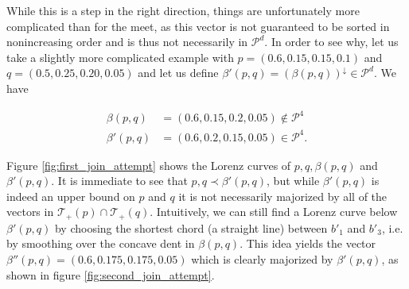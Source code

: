 While this is a step in the right direction, things are unfortunately more complicated than for the meet, as this vector is not guaranteed to be sorted in nonincreasing order and is thus not necessarily in $\mathcal{P}^d$. In order to see why, let us take a slightly more complicated example with $p = (0.6, 0.15, 0.15, 0.1)$ and $q = (0.5, 0.25, 0.20, 0.05)$ and let us define $\beta'(p, q) = (\beta(p, q))^\downarrow \in \mathcal{P}^d$. We have

\begin{align}
    \beta(p, q) &= (0.6, 0.15, 0.2, 0.05) \notin \mathcal{P}^4 \\
    \beta'(p, q) &= (0.6, 0.2, 0.15, 0.05) \in \mathcal{P}^4.
\end{align}

Figure \ref{fig:first_join_attempt} shows the Lorenz curves of $p, q, \beta(p, q)$ and $\beta'(p, q)$. It is immediate to see that $p, q \prec \beta'(p, q)$, but while $\beta'(p, q)$  is indeed an upper bound on $p$ and $q$ it is not necessarily majorized by all of the vectors in $\mathcal{T}_+(p) \cap \mathcal{T}_+(q)$. Intuitively, we can still find a Lorenz curve below $\beta'(p, q)$ by choosing the shortest chord (a straight line) between $b'_1$ and $b'_3$, i.e. by smoothing over the concave dent in $\beta(p, q)$. This idea yields the vector $\beta''(p, q) = (0.6, 0.175, 0.175, 0.05)$ which is clearly majorized by $\beta'(p, q)$, as shown in figure \ref{fig:second_join_attempt}.

